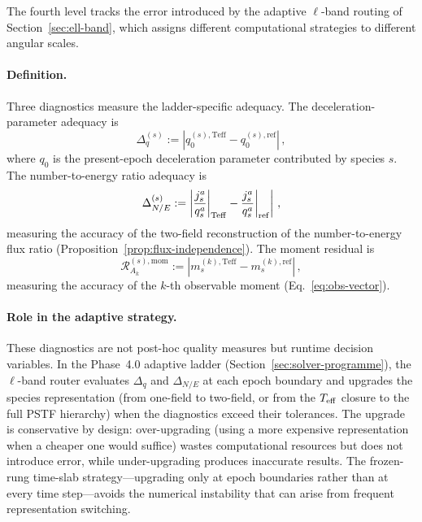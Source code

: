 The fourth level tracks the error introduced by the
adaptive $\ell$-band routing of
Section~\ref{sec:ell-band}, which assigns different
computational strategies to different angular scales.


\paragraph{Definition.}

Three diagnostics measure the ladder-specific adequacy.
The deceleration-parameter adequacy is
\begin{equation}\label{eq:err-Dq}
\Delta_q^{(s)}
:= \left|
  q^{(s),\text{Teff}}_0
  - q^{(s),\text{ref}}_0
\right|\,,
\end{equation}
where $q_0$ is the present-epoch deceleration parameter
contributed by species $s$.  The number-to-energy ratio
adequacy is
\begin{equation}\label{eq:err-DNE}
\Delta_{N/E}^{(s)}
:= \left|
  \frac{j_s^a}{q_s^a}\bigg|_{\rm Teff}
  - \frac{j_s^a}{q_s^a}\bigg|_{\rm ref}
\right|\,,
\end{equation}
measuring the accuracy of the two-field reconstruction of
the number-to-energy flux ratio
(Proposition~\ref{prop:flux-independence}).  The moment
residual is
\begin{equation}\label{eq:err-Rmom}
\mathcal{R}_{A_k}^{(s),\text{mom}}
:= \left|
  m_s^{(k),\text{Teff}}
  - m_s^{(k),\text{ref}}
\right|\,,
\end{equation}
measuring the accuracy of the $k$-th observable moment
(Eq.~\ref{eq:obs-vector}).


\paragraph{Role in the adaptive strategy.}

These diagnostics are not post-hoc quality measures but
runtime decision variables.  In the Phase~4.0 adaptive
ladder (Section~\ref{sec:solver-programme}), the
$\ell$-band router evaluates $\Delta_q$ and
$\Delta_{N/E}$ at each epoch boundary and upgrades the
species representation (from one-field to two-field, or
from the $T_{\mathrm{eff}}$ closure to the full PSTF hierarchy) when
the diagnostics exceed their tolerances.  The upgrade is
conservative by design: over-upgrading (using a more
expensive representation when a cheaper one would suffice)
wastes computational resources but does not introduce
error, while under-upgrading produces inaccurate results.
The frozen-rung time-slab strategy---upgrading only at
epoch boundaries rather than at every time step---avoids
the numerical instability that can arise from frequent
representation switching.


